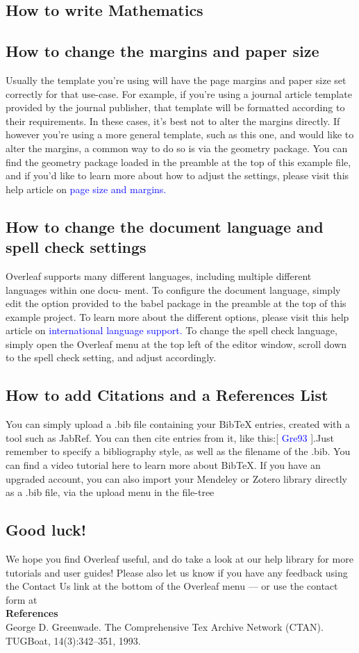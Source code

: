 \documentclass{article}
\begin{document}
	\subsection{How to write Mathematics}	
	
	\subsection{How to change the margins and paper size}
	Usually the template you’re using will have the page margins and paper size set correctly for that
	use-case. For example, if you’re using a journal article template provided by the journal publisher,
	that template will be formatted according to their requirements. In these cases, it’s best not to alter
	the margins directly.
	If however you’re using a more general template, such as this one, and would like to alter the
	margins, a common way to do so is via the geometry package. You can find the geometry package
	loaded in the preamble at the top of this example file, and if you’d like to learn more about how to
	adjust the settings, please visit this help article on \textcolor{blue}{page size and margins.}
	\subsection{How to change the document language and spell check settings}
		Overleaf supports many different languages, including multiple different languages within one docu-
		ment.
		To configure the document language, simply edit the option provided to the babel package in the
		preamble at the top of this example project. To learn more about the different options, please visit
		this help article on \textcolor{blue}{international language support.}
		To change the spell check language, simply open the Overleaf menu at the top left of the editor
		window, scroll down to the spell check setting, and adjust accordingly.
	\subsection{How to add Citations and a References List}
	You can simply upload a .bib file containing your BibTeX entries, created with a tool such as JabRef.
	You can then cite entries from it, like this:[ \textcolor{blue}{Gre93} ].Just remember to specify a bibliography style, as
	well as the filename of the .bib. You can find a video tutorial here to learn more about BibTeX.
	If you have an upgraded account, you can also import your Mendeley or Zotero library directly as
	a .bib file, via the upload menu in the file-tree
	\subsection{Good luck!}
	We hope you find Overleaf useful, and do take a look at our help library for more tutorials and user
	guides! Please also let us know if you have any feedback using the Contact Us link at the bottom of
	the Overleaf menu — or use the contact form at \\
	 \textbf{ References}\\
	 George D. Greenwade. The Comprehensive Tex Archive Network (CTAN). TUGBoat,
	14(3):342–351, 1993.
	
\end{document}
